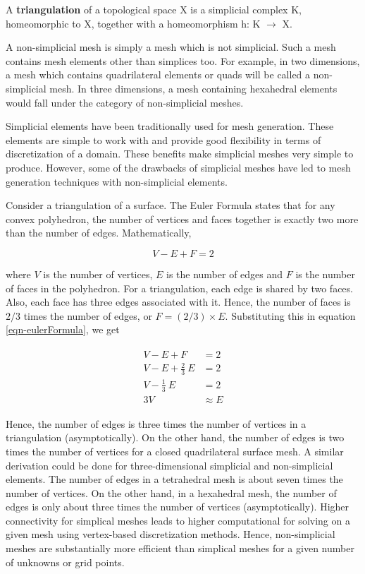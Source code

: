 \begin{definition}
	A \textbf{triangulation} of a topological space X is a simplicial complex K, homeomorphic to X, together with a homeomorphism h: K $\rightarrow$ X.
\end{definition}

A non-simplicial mesh is simply a mesh which is not simplicial. Such a mesh contains mesh elements other than simplices too. For example, in two dimensions, a mesh which contains quadrilateral elements or quads will be called a non-simplicial mesh. In three dimensions, a mesh containing hexahedral elements would fall under the category of non-simplicial meshes.

Simplicial elements have been traditionally used for mesh generation. These elements are simple to work with and provide good flexibility in terms of discretization of a domain. These benefits make simplicial meshes very simple to produce. However, some of the drawbacks of simplicial meshes have led to mesh generation techniques with non-simplicial elements.

Consider a triangulation of a surface. The Euler Formula states that for any convex polyhedron, the number of vertices and faces together is exactly two more than the number of edges. Mathematically,

\begin{equation}
V-E+F=2
\label{eqn-eulerFormula}
\end{equation}

where $V$ is the number of vertices, $E$ is the number of edges and $F$ is the number of faces in the polyhedron. For a triangulation, each edge is shared by two faces. Also, each face has three edges associated with it. Hence, the number of faces is $2/3$ times the number of edges, or $F= (2/3) \times E$. Substituting this in equation \ref{eqn-eulerFormula}, we get

\begin{align}
\begin{split}
		V - E + F  & = 2 \\
		V - E + \frac{2}{3} \: E & = 2 \\
		V - \frac{1}{3} \: E & = 2 \\
		3V & \approx E
		\end{split}
\end{align}

Hence, the number of edges is three times the number of vertices in a triangulation (asymptotically). On the other hand, the number of edges is two times the number of vertices for a closed quadrilateral surface mesh. A similar derivation could be done for three-dimensional simplicial and non-simplicial elements. The number of edges in a tetrahedral mesh is about seven times the number of vertices. On the other hand, in a hexahedral mesh, the number of edges is only about three times the number of vertices (asymptotically). Higher connectivity for simplical meshes leads to higher computational for solving on a given mesh using vertex-based discretization methods. Hence, non-simplicial meshes are substantially more efficient than simplical meshes for a given number of unknowns or grid points.

